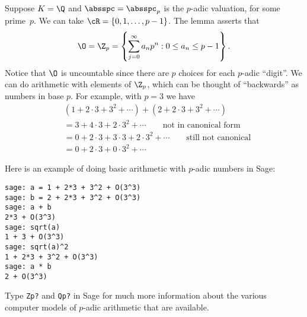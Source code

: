 \begin{example}
  Suppose $K=\Q$ and $\absspc=\absspc_p$ is the $p$-adic valuation,
  for some prime~$p$.  We can take $\cR=\{0,1,\ldots, p-1\}$.
  The lemma asserts that 
  $$\O=\Z_p = \left\{ \sum_{j=0}^{\infty} a_n p^n : 0\leq a_n\leq
    p-1\right\}.$$
  Notice that $\O$ is uncountable since there are $p$
  choices for each $p$-adic ``digit''.  We can do arithmetic with
  elements of $\Z_p$, which can be thought of ``backwards'' as numbers
  in base $p$.  For example, with $p=3$ we have
  \begin{align*}
&   (1+2\cdot 3 + 3^2 + \cdots ) + (2 + 2\cdot 3 + 3^2 + \cdots ) \\
& = 3+4\cdot 3 + 2\cdot 3^2 + \cdots   \qquad \text{not in canonical form}\\
& = 0 + 2\cdot 3 + 3\cdot 3 + 2\cdot 3^2 + \cdots \qquad\text{still not canonical}\\
& = 0 + 2\cdot 3 + 0\cdot 3^2 + \cdots 
\end{align*}

Here is an example of doing basic arithmetic with $p$-adic
numbers in Sage:
\begin{lstlisting}
sage: a = 1 + 2*3 + 3^2 + O(3^3)
sage: b = 2 + 2*3 + 3^2 + O(3^3)
sage: a + b
2*3 + O(3^3)
sage: sqrt(a)
1 + 3 + O(3^3)
sage: sqrt(a)^2
1 + 2*3 + 3^2 + O(3^3)
sage: a * b
2 + O(3^3)
\end{lstlisting}
Type {\tt Zp?} and {\tt Qp?} in Sage for much more information
about the various computer models of $p$-adic arithmetic that
are available.

\end{example}

